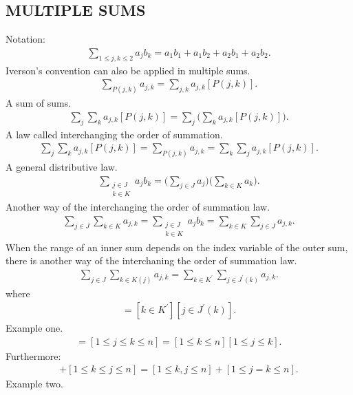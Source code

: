 \documentclass{article}
\begin{document}
\subsection{MULTIPLE SUMS}
Notation:
\begin{align}
\sum_{1\le j,k \le 2}{a_j b_k} = a_1 b_1 + a_1 b_2 + a_2 b_1 + a_2 b_2.
\end{align}
Iverson's convention can also be applied in multiple sums.
\begin{align}
\sum_{P(j,k)}{a_{j,k}} = \sum_{j,k}{a_{j,k}[P(j,k)]}.
\end{align}
A sum of sums.
\begin{align}
\sum_j \sum_k{a_{j,k}[P(j,k)]} = \sum_j {\Big(\sum_k{a_{j,k}[P(j,k)]}\Big)}.
\end{align}
A law called interchanging the order of summation.
\begin{align}
\sum_j \sum_k{a_{j,k}[P(j,k)]} = \sum_{P(j,k)}{a_{j,k}} = \sum_k \sum_j{a_{j,k}[P(j,k)]}.
\end{align}
A general distributive law.
\begin{align}
\sum_{\substack{j\in J \\ k\in K}}{a_j b_k} = \Big( \sum_{j\in J}{a_j}\Big) \Big( \sum_{k\in K}{a_k} \Big).
\end{align}
Another way of the interchanging the order of summation law.
\begin{align}
\sum_{j\in J} \sum_{k \in K} {a_{j,k}} = \sum_{\substack{j\in J \\ k\in K}}{a_j b_k} = \sum_{k\in K} \sum_{j \in J} {a_{j,k}}.
\end{align}
When the range of an inner sum depends on the index variable of the outer sum, there is another way of the interchaning the order of summation law.
\begin{align}
\sum_{j\in J} \sum_{k\in K(j)} {a_{j,k}} = \sum_{k\in K^\prime} \sum_{j\in J^\prime(k)} {a_{j,k}}.
\end{align}
where
\begin{align}
[j\in J][k\in K(j)] = [k\in K^\prime][j\in J^\prime (k)].
\end{align}
Example one.
\begin{align}
[1 \le j \le n][j \le k \le n] = [1 \le j \le k \le n] = [1 \le k \le n][1 \le j \le k].
\end{align}
Furthermore:
\begin{align}
[1 \le j \le k \le n] + [1 \le k \le j \le n] = [1 \le k,j \le n] + [1 \le j = k \le n].
\end{align}
Example two.
\end{document}

